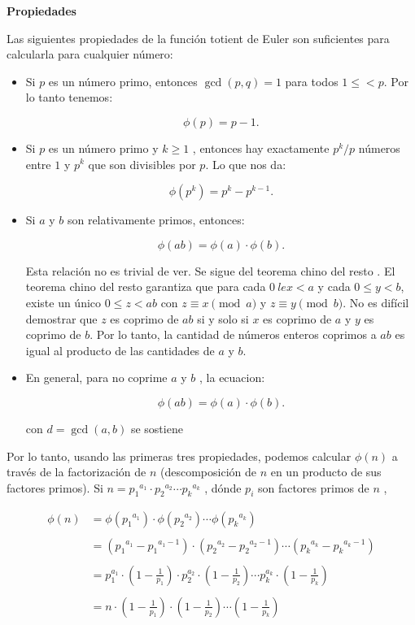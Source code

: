 \textbf{Propiedades}

Las siguientes propiedades de la función totient de Euler son suficientes para calcularla para cualquier número:
\begin{itemize}
	\item Si $p$ es un número primo, entonces $\gcd(p,q) = 1$ para todos $1 \leq < p$. Por lo tanto tenemos:
	
	$$\phi (p) = p - 1.$$
	
	\item Si $p$ es un número primo y $k\ge 1$ , entonces hay exactamente $p^k / p$ números entre $1$ y $p^k$ que son divisibles por $p$. Lo que nos da:
	
	$$\phi(p^k) = p^k - p^{k-1}.$$
	
	\item Si $a$ y $b$ son relativamente primos, entonces:
	
	$$\phi(a b) = \phi(a) \cdot \phi(b).$$
	
	
	Esta relación no es trivial de ver. Se sigue del teorema chino del resto . 
	El teorema chino del resto garantiza que para cada $0 \ le x < a$ y cada $0 
	\le y < b$, existe un único $0 \le z < ab$ con $z \equiv x \pmod{a}$ y $z \equiv y \pmod{b}$. No es difícil demostrar que $z$ es coprimo de $ab$ si y 
	solo si $x$ es coprimo de $a$ y $y$ es coprimo de $b$. Por lo tanto, la 
	cantidad de números enteros coprimos a $ab$ es igual al producto de las 
	cantidades de $a$ y $b$.
	
	\item En general, para no coprime $a$ y $b$ , la ecuacion:
	
	$$\phi(a b) = \phi(a) \cdot \phi(b).$$
	
	con $d = \gcd(a, b)$ se  sostiene
	
	
\end{itemize}

	Por lo tanto, usando las primeras tres propiedades, podemos calcular $\phi(n)$ a través de la factorización de $n$ (descomposición de $n$ en un producto de sus factores primos). Si $n = {p_1}^{a_1} \cdot {p_2}^{a_2} \cdots {p_k}^{a_k}$ , dónde $p_i$ son factores primos de $n$ ,
	
	\begin{align}
		\phi (n) &= \phi ({p_1}^{a_1}) \cdot \phi ({p_2}^{a_2}) \cdots  \phi ({p_k}^{a_k}) \\\\
		&= \left({p_1}^{a_1} - {p_1}^{a_1 - 1}\right) \cdot \left({p_2}^{a_2} - {p_2}^{a_2 - 1}\right) \cdots \left({p_k}^{a_k} - {p_k}^{a_k - 1}\right) \\\\
		&= p_1^{a_1} \cdot \left(1 - \frac{1}{p_1}\right) \cdot p_2^{a_2} \cdot \left(1 - \frac{1}{p_2}\right) \cdots p_k^{a_k} \cdot \left(1 - \frac{1}{p_k}\right) \\\\
		&= n \cdot \left(1 - \frac{1}{p_1}\right) \cdot \left(1 - \frac{1}{p_2}\right) \cdots \left(1 - \frac{1}{p_k}\right)
	\end{align}

